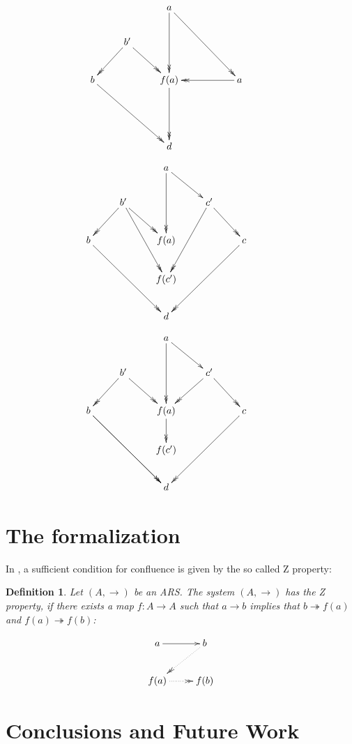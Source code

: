 \documentclass[11pt]{article}
\newtheorem{definition}{Definition}[section]
\newcommand{\tto}{\twoheadrightarrow}
\begin{document}
\[
      \xymatrix{
        & & a \ar@{->>}[dd] \ar@{->>}[ddrr] & & \\
        & b' \ar@{->>}[dl] \ar@{->>}[dr] & & & \\
        b \ar@{->>}[ddrr] & & f(a) \ar@{->>}[dd] & &  a \ar@{->>}[ll] \\
        & & & & & \\
        & & d & &
      }
    \]

\[
       \xymatrix{
        & & a \ar@{->>}[dd] \ar@{->}[dr] & & \\
        & b' \ar@{->>}[dl] \ar@{->>}[dr] \ar@[blue]@{->>}[ddr] & & c' \ar@{->>}[dr] \ar@[blue]@{->>}[ddl] & \\
        b \ar@[red]@{->>}[ddrr] & & f(a) & &  c  \ar@[red]@{->>}[ddll] \\
        & & f(c') & & & \\
        & & d  & & 
      }
     \]

\[
       \xymatrix{
        & & a \ar@{->>}[dd] \ar@{->}[dr] & & \\
        & b' \ar@{->>}[dl] \ar@{->>}[dr] & & c' \ar@{->>}[dr] \ar@{->>}[dl] & \\
        b \ar@{->>}[ddrr] \ar@{->>}[ddrr] & & f(a) \ar@{->>}[d] & &  c  \ar@{->>}[ddll] \\
        & & f(c') & & & \\
        & & d  & & 
      }
     \]
\section{The formalization}
\label{sec:org2a73302}

In \cite{ZPropertyDraft}, a sufficient condition for confluence is given
by the so called Z property:

\begin{definition}
Let \((A,\to)\) be an ARS. The system \((A,\to)\) has the Z property,
if there exists a map \(f:A \to A\) such that \(a \to b\) implies
that \(b \tto f(a)\) and \(f(a) \tto f(b)\):

\[
  \xymatrix{
   a \ar[r] &  b \ar@{.>>}[dl]\\
   f(a) \ar@{.>>}[r] & f(b) \\ 
  }
 \]
\end{definition}


\section{Conclusions and Future Work}
\label{sec:orgd7f8e05}


 
\end{document}
